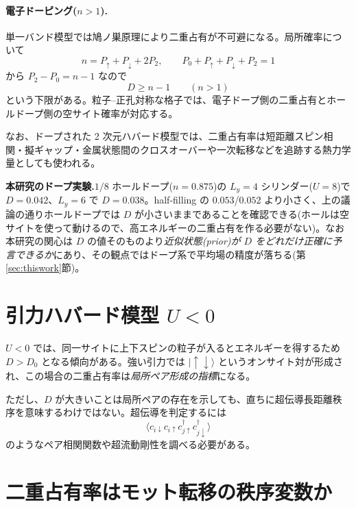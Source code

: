 \documentclass[11pt,a4paper]{ltjsarticle}
\newcommand{\ket}[1]{|#1\rangle}
\newcommand{\ev}[1]{\langle #1\rangle}
\newcommand{\cd}{c^\dagger}
\newcommand{\up}{\uparrow}
\newcommand{\dn}{\downarrow}
\begin{document}
\paragraph{電子ドーピング($n>1$).}単一バンド模型では鳩ノ巣原理により二重占有が不可避になる。局所確率について
\begin{equation}
  n = P_\up+P_\dn+2P_2,\qquad P_0+P_\up+P_\dn+P_2=1
\end{equation}
から $P_2-P_0=n-1$ なので
\begin{equation}
  \boxed{\ D \ge n-1\qquad (n>1)\ }
\end{equation}
という下限がある。粒子--正孔対称な格子では、電子ドープ側の二重占有とホールドープ側の空サイト確率が対応する。

なお、ドープされた 2 次元ハバード模型では、二重占有率は短距離スピン相関・擬ギャップ・金属状態間のクロスオーバーや一次転移などを追跡する熱力学量としても使われる。

\begin{exbox}
\textbf{本研究のドープ実験.}$1/8$ ホールドープ($n=0.875$)の $L_y=4$ シリンダー($U=8$)で $D=0.042$、$L_y=6$ で $D=0.038$。half-filling の $0.053$/$0.052$ より小さく、上の議論の通りホールドープでは $D$ が小さいままであることを確認できる(ホールは空サイトを使って動けるので、高エネルギーの二重占有を作る必要がない)。なお本研究の関心は $D$ の値そのものより\emph{近似状態(prior)が $D$ をどれだけ正確に予言できるか}にあり、その観点ではドープ系で平均場の精度が落ちる(第\ref{sec:thiswork}節)。
\end{exbox}

\section{引力ハバード模型 $U<0$}

$U<0$ では、同一サイトに上下スピンの粒子が入るとエネルギーを得するため $D>D_0$ となる傾向がある。強い引力では $\ket{\up\dn}$ というオンサイト対が形成され、この場合の二重占有率は\emph{局所ペア形成の指標}になる。

ただし、$D$ が大きいことは局所ペアの存在を示しても、直ちに超伝導長距離秩序を意味するわけではない。超伝導を判定するには
\begin{equation}
  \ev{c_{i\dn}c_{i\up}\cd_{j\up}\cd_{j\dn}}
\end{equation}
のようなペア相関関数や超流動剛性を調べる必要がある。

\section{二重占有率はモット転移の秩序変数か}
\end{document}
